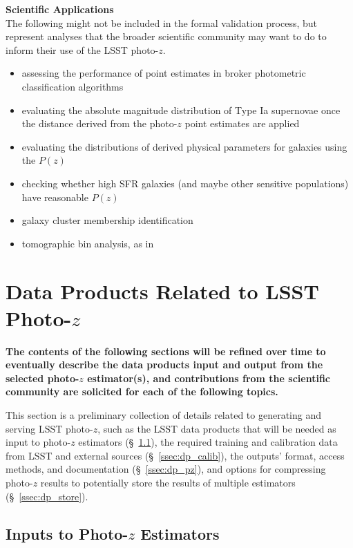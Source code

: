 \documentclass[DM,lsstdraft,toc]{lsstdoc}
\begin{document}
{\bf Scientific Applications}\\
The following might not be included in the formal validation process, but represent analyses that the broader scientific community may want to do to inform their use of the LSST photo-$z$.
\vspace{-15pt}
\begin{itemize}
\item assessing the performance of point estimates in broker photometric classification algorithms
\item evaluating the absolute magnitude distribution of Type Ia supernovae once the distance derived from the photo-$z$ point estimates are applied
\item evaluating the distributions of derived physical parameters for galaxies using the $P(z)$
\item checking whether high SFR galaxies (and maybe other sensitive populations) have reasonable $P(z)$
\item galaxy cluster membership identification
\item tomographic bin analysis, as in \citep{2019MNRAS.482.2807C}
\end{itemize}


\clearpage
\section{Data Products Related to LSST Photo-$z$}\label{sec:dp}

\textbf{The contents of the following sections will be refined over time to eventually describe the data products input and output from the selected photo-$z$ estimator(s), and contributions from the scientific community are solicited for each of the following topics.}

This section is a preliminary collection of details related to generating and serving LSST photo-$z$, such as the LSST data products that will be needed as input to photo-$z$ estimators (\S~\ref{ssec:dp_objvals}), the required training and calibration data from LSST and external sources (\S~\ref{ssec:dp_calib}), the outputs' format, access methods, and documentation (\S~\ref{ssec:dp_pz}), and options for compressing photo-$z$ results to potentially store the results of multiple estimators (\S~\ref{ssec:dp_store}).


\subsection{Inputs to Photo-$z$ Estimators}\label{ssec:dp_objvals}
\end{document}
